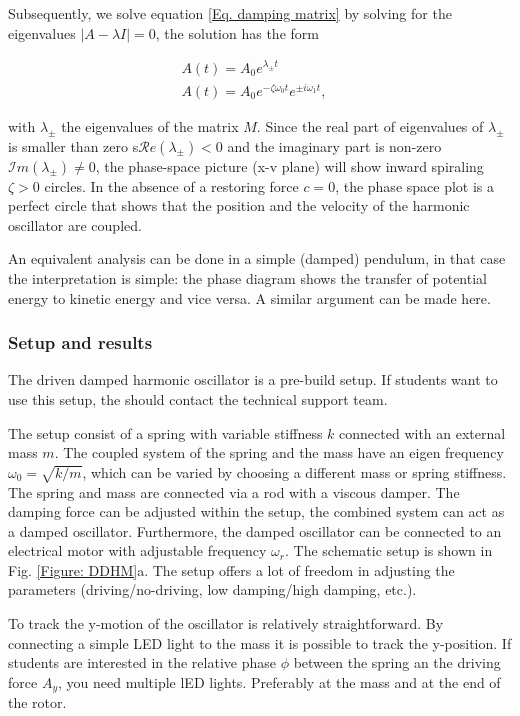 \documentclass{article}
\begin{document}
Subsequently, we solve equation \ref{Eq. damping matrix} by solving for the eigenvalues $|A-\lambda I| = 0$, the solution has the form

\begin{align}
    A(t) = A_0 e^{\lambda_{\pm}t} & \\
    A(t) = A_0 e^{-\zeta \omega_0 t}e^{\pm i\omega_1 t},
\end{align}

with $\lambda_{\pm}$ the eigenvalues of the matrix $M$.
Since the real part of eigenvalues of $\lambda_{\pm}$ is smaller than zero s$\mathcal{R}e(\lambda_{\pm}) < 0 $ and the imaginary part is non-zero $\mathcal{I}m(\lambda_{\pm})\neq 0$, the phase-space picture (x-v plane) will show inward spiraling $\zeta>0$ circles. In the absence of a restoring force $c = 0$, the phase space plot is a perfect circle that shows that the position and the velocity of the harmonic oscillator are coupled. 

An equivalent analysis can be done in a simple (damped) pendulum, in that case the interpretation is simple: the phase diagram shows the transfer of potential energy to kinetic energy and vice versa. A similar argument can be made here. 

\subsubsection{Setup and results}
The driven damped harmonic oscillator is a pre-build setup. If students want to use this setup, the should contact the technical support team.

The setup consist of a spring with variable stiffness $k$ connected with an external mass $m$. The coupled system of the spring and the mass have an eigen frequency $\omega_0 = \sqrt{k/m}$, which can be varied by choosing a different mass or spring stiffness. The spring and mass are connected via a rod with a viscous damper. The damping force can be adjusted within the setup, the combined system can act as a damped oscillator. Furthermore, the damped oscillator can be connected to an electrical motor with adjustable frequency $\omega_r$. The schematic setup is shown in Fig. \ref{Figure: DDHM}a. The setup offers a lot of freedom in adjusting the parameters (driving/no-driving, low damping/high damping, etc.).

To track the y-motion of the oscillator is relatively straightforward. By connecting a simple LED light to the mass it is possible to track the y-position. If students are interested in the relative phase $\phi$ between the spring an the driving force $A_y$, you need multiple lED lights. Preferably at the mass and at the end of the rotor.
\end{document}
